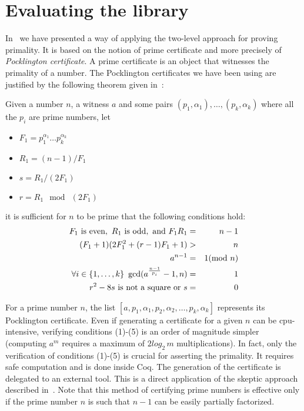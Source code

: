\section{Evaluating the library \label{bench}}

In~\cite{GreTheWer} we have presented a way of applying 
the two-level approach for proving primality. It is based on the
notion of prime certificate and more 
precisely of {\it Pocklington certificate}.
A prime certificate is an object that witnesses the primality of a number.
The Pocklington certificates we have been using are justified by the following
theorem given in~\cite{lehmer}:
\begin{theorem}\label{lehmer}
Given a number $n$, a witness $a$ and some pairs 
$(p_1,\alpha_1),\dots,(p_k,\alpha_k)$
 where all the $p_i$ are prime numbers,
 let
 \begin{itemize}
\item[]$F_1 = p_1^{\alpha_1}\dots p_k^{\alpha_k}$
\item[]$R_1 = (n - 1) / F_1$
\item[]$ s = R_1 / (2F_1)$
\item[] $r = R_1 \mod\ (2F_1)$
 \end{itemize}
 it is sufficient for $n$ to be prime that the following conditions hold:
\begin{eqnarray}
F_1 \,\,\hbox{is even},\,\,
R_1 \,\, \hbox{is odd}, \,\,\hbox{and}\,\,
F_1R_1  &=&  n -1\\
(F_1 + 1) (2F_1^2 + (r - 1) F_1 + 1) & >& n\\
a^{n-1} &=& 1 (\mod\ n)\\
\forall i\in\{1,\dots,k\}~\gcd(a^{\frac{n-1}{p_i}}-1,n)&=&1\\
r^2 - 8 s\,\,\mbox{is not a square}\,\,\hbox{or}\,\,s &=& 0
\end{eqnarray}
\end{theorem}
For a prime number $n$, the list 
$[a, p_1, \alpha_1, p_2, \alpha_2, \dots, p_k, \alpha_k]$
represents its Pocklington certificate.
Even if generating a certificate for a given $n$ can be cpu-intensive, 
verifying conditions (1)-(5) is an order of magnitude simpler (computing $a^m$ requires
a maximum of $2\textit{log}_2\, m$ multiplications). In fact, only
the verification of conditions (1)-(5) is crucial for asserting the primality. 
It requires safe computation and is done inside {\sc Coq}.
The generation of the certificate is delegated to an external tool.
This is a direct application of the skeptic approach described 
in~\cite{BarBar,HarThe}. Note that this method of certifying prime numbers
is effective only if the prime number $n$ is such that  $n-1$ can be easily
partially factorized.
                 
